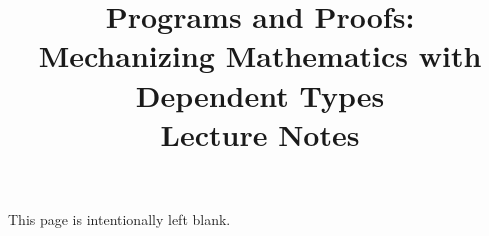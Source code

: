 \documentclass[12pt]{report}
\title{Programs and Proofs:
\\
Mechanizing Mathematics with Dependent Types
\\
{\normalsize Lecture Notes}
}
\author{}
\begin{document}
\maketitle

\thispagestyle{empty}
\mbox{}\vfill

\begin{center}

This page is intentionally left blank.

\end{center}

\clearpage
{}
{}

\setcounter{page}{1}
\tableofcontents














\clearpage
{}
{}



\end{document}
